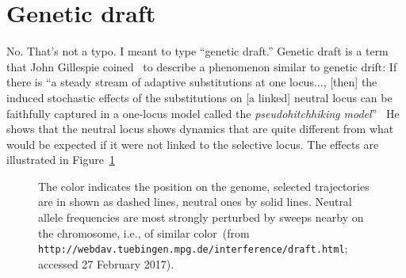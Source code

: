 \documentclass[12pt]{article}
\begin{document}
\section*{Genetic draft}

No. That's not a typo. I meant to type ``genetic draft.'' Genetic
draft is a term that John Gillespie coined~\cite{Gillespie-2000} to
describe a phenomenon similar to genetic drift: If there is ``a steady
stream of adaptive substitutions at one locus$\dots$, [then] the
induced stochastic effects of the substitutions on [a linked] neutral
locus can be faithfully captured in a one-locus model called the {\it
  pseudohitchhiking model}''~\cite[p. 909]{Gillespie-2000} He shows
that the neutral locus shows dynamics that are quite different from
what would be expected if it were not linked to the selective
locus. The effects are illustrated in Figure~\ref{fig:genetic-draft}

\begin{figure}
\begin{center}
\end{center}
\caption{The color indicates the position on the genome, selected
  trajectories are in shown as dashed lines, neutral ones by solid
  lines. Neutral allele frequencies are most strongly perturbed by
  sweeps nearby on the chromosome, i.e., of similar color~(from
  {\tt http://webdav.tuebingen.mpg.de/interference/draft.html};
  accessed 27 February 2017).}\label{fig:genetic-draft}  
\end{figure}
\end{document}

